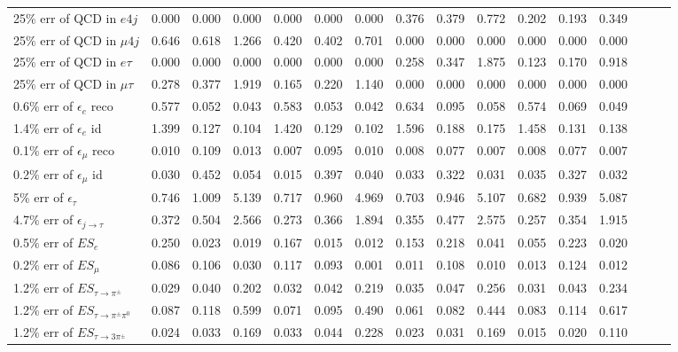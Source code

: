 \begin{sidewaystable}[p]
\begin{tabular}{|l|ccc|ccc|ccc|ccc|ccc|}
  25$\%$ err of QCD in $e 4j$                & 0.000 & 0.000 & 0.000 & 0.000 & 0.000 & 0.000 & 0.376 & 0.379 & 0.772 & 0.202 & 0.193 & 0.349 \\ 
  25$\%$ err of QCD in $\mu 4j$              & 0.646 & 0.618 & 1.266 & 0.420 & 0.402 & 0.701 & 0.000 & 0.000 & 0.000 & 0.000 & 0.000 & 0.000 \\ 
  25$\%$ err of QCD in $e\tau$               & 0.000 & 0.000 & 0.000 & 0.000 & 0.000 & 0.000 & 0.258 & 0.347 & 1.875 & 0.123 & 0.170 & 0.918 \\ 
  25$\%$ err of QCD in $\mu\tau$             & 0.278 & 0.377 & 1.919 & 0.165 & 0.220 & 1.140 & 0.000 & 0.000 & 0.000 & 0.000 & 0.000 & 0.000 \\ 
  0.6$\%$ err of $\epsilon_e$ reco           & 0.577 & 0.052 & 0.043 & 0.583 & 0.053 & 0.042 & 0.634 & 0.095 & 0.058 & 0.574 & 0.069 & 0.049 \\ 
  1.4$\%$ err of $\epsilon_e$ id             & 1.399 & 0.127 & 0.104 & 1.420 & 0.129 & 0.102 & 1.596 & 0.188 & 0.175 & 1.458 & 0.131 & 0.138 \\ 
  0.1$\%$ err of $\epsilon_\mu$ reco         & 0.010 & 0.109 & 0.013 & 0.007 & 0.095 & 0.010 & 0.008 & 0.077 & 0.007 & 0.008 & 0.077 & 0.007 \\ 
  0.2$\%$ err of $\epsilon_\mu$ id           & 0.030 & 0.452 & 0.054 & 0.015 & 0.397 & 0.040 & 0.033 & 0.322 & 0.031 & 0.035 & 0.327 & 0.032 \\ 
  5$\%$ err of $\epsilon_\tau$               & 0.746 & 1.009 & 5.139 & 0.717 & 0.960 & 4.969 & 0.703 & 0.946 & 5.107 & 0.682 & 0.939 & 5.087 \\ 
  4.7$\%$ err of $\epsilon_{j\to\tau}$       & 0.372 & 0.504 & 2.566 & 0.273 & 0.366 & 1.894 & 0.355 & 0.477 & 2.575 & 0.257 & 0.354 & 1.915 \\ 
  0.5$\%$ err of $ES_{e}$                    & 0.250 & 0.023 & 0.019 & 0.167 & 0.015 & 0.012 & 0.153 & 0.218 & 0.041 & 0.055 & 0.223 & 0.020 \\ 
  0.2$\%$ err of $ES_{\mu}$                  & 0.086 & 0.106 & 0.030 & 0.117 & 0.093 & 0.001 & 0.011 & 0.108 & 0.010 & 0.013 & 0.124 & 0.012 \\ 
  1.2$\%$ err of $ES_{\tau\to\pi^\pm}$       & 0.029 & 0.040 & 0.202 & 0.032 & 0.042 & 0.219 & 0.035 & 0.047 & 0.256 & 0.031 & 0.043 & 0.234 \\ 
  1.2$\%$ err of $ES_{\tau\to\pi^\pm\pi^0}$  & 0.087 & 0.118 & 0.599 & 0.071 & 0.095 & 0.490 & 0.061 & 0.082 & 0.444 & 0.083 & 0.114 & 0.617 \\ 
  1.2$\%$ err of $ES_{\tau\to3\pi^\pm}$      & 0.024 & 0.033 & 0.169 & 0.033 & 0.044 & 0.228 & 0.023 & 0.031 & 0.169 & 0.015 & 0.020 & 0.110 \\ 

\end{tabular}
\end{sidewaystable}
